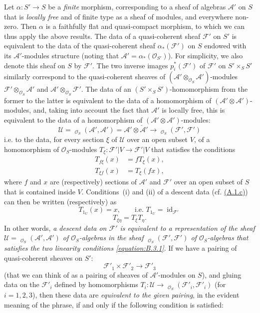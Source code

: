 \documentclass{article}
\theoremstyle{plain}
\theoremstyle{definition}
\newcommand{\sh}[1]{{\mathscr{#1}}}
\DeclareMathOperator{\id}{id}
\DeclareMathOperator{\Hom}{Hom}
\DeclareMathOperator{\shHom}{\underline{\Hom}}
\newcommand{\oldpage}[1]{\marginpar{\footnotesize$\Big\vert$ \textit{p.~#1}}}
\begin{document}
Let $\alpha\colon S'\to S$ be a \emph{finite} morphism, corresponding to a sheaf of algebras $\sh{A}'$ on $S$ that is \emph{locally free} and of finite type as a sheaf of modules, and everywhere non-zero.
Then $\alpha$ is a faithfully flat and quasi-compact morphism, to which we can thus apply the above results.
The data of a quasi-coherent sheaf $\sh{F}'$ on $S'$ is equivalent to the data of the quasi-coherent sheaf $\alpha_*(\sh{F}')$ on $S$ endowed with its $\sh{A}'$-modules structure (noting that $\sh{A}'=\alpha_*(\sh{O}_{S'})$).
For simplicity, we also denote this sheaf on $S$ by $\sh{F}'$.
The two inverse images $p_i^*(\sh{F}')$ of $\sh{F}'$ on $S'\times_S S'$ similarly correspond to the quasi-coherent sheaves of $(\sh{A}'\otimes_{\sh{O}_S}\sh{A}')$-modules $\sh{F}'\otimes_{\sh{O}_S}\sh{A}'$ and $\sh{A}'\otimes_{\sh{O}_S}\sh{F}'$.
The data of an $(S'\times_S S')$-homomorphism from the former to the latter is equivalent to the data of a homomorphism of $(\sh{A}'\otimes\sh{A}')$-modules, and, taking into account the fact that $\sh{A}'$ is locally free, this is equivalent to the data of a homomorphism of $(\sh{A}'\otimes\sh{A}')$-modules:
\[
  \sh{U}
  = \shHom_{\sh{O}_S}(\sh{A}',\sh{A}')
  = \sh{A}'\otimes\check{\sh{A}}'
  \to \shHom_{\sh{O}_S}(\sh{F}',\sh{F}')
\]
i.e. to the data, for every section $\xi$ of $\sh{U}$ over an open subset $V$, of a homomorphism of $\sh{O}_S$-modules $T_\xi\colon\sh{F}'|V\to\sh{F}'|V$ that satisfies the conditions
\[
\label{equation:B.3.1}
  \begin{aligned}
    T_{f\xi}(x) &= fT_\xi(x),
  \\T_{\xi f}(x) &= T_\xi(fx),
  \end{aligned}
\tag{3.1}
\]
where $f$ and $x$ are (respectively) sections of $\sh{A}'$ and $\sh{F}'$ over an open subset of $S$ that is contained inside $V$.
Conditions~(i) and (ii) of a descent data (cf. \hyperref[A.1.c]{(A.1.c)}) can then be written (respectively) as
\[
\label{equation:B.3.2}
  T_{1_U}(x) = x,
  \qquad\mbox{i.e. $T_{1_U}=\id_{\sh{F}'}$}
\tag{3.2}
\]
\[
\label{equation:B.3.3}
  T_{\xi\eta} = T_\xi T_\eta.
\tag{3.3}
\]
In other words, \emph{a descent data on $\sh{F}'$ is equivalent to a representation of the sheaf $\sh{U}=\shHom_{\sh{O}_S}(\sh{A}',\sh{A}')$ of $\sh{O}_S$-algebras in the sheaf $\shHom_{\sh{O}_S}(\sh{F}',\sh{F}')$ of $\sh{O}_S$-algebras that satisfies the two linearity conditions \cref{equation:B.3.1}}.
If we have a pairing of quasi-coherent sheaves on $S'$:
\[
  \sh{F}'_1\times\sh{F}'_2 \to \sh{F}'_3
\]
(that we can think of as a pairing of sheaves of $\sh{A}'$-modules on $S$),
\oldpage{190-22}
and gluing data on the $\sh{F}'_i$ defined by homomorphisms $T_i\colon\sh{U}\to\shHom_{\sh{O}_S}(\sh{F}'_i,\sh{F}'_i)$ (for $i=1,2,3$), then these data are \emph{equivalent to the given pairing}, in the evident meaning of the phrase, if and only if the following condition is satisfied:
\end{document}
